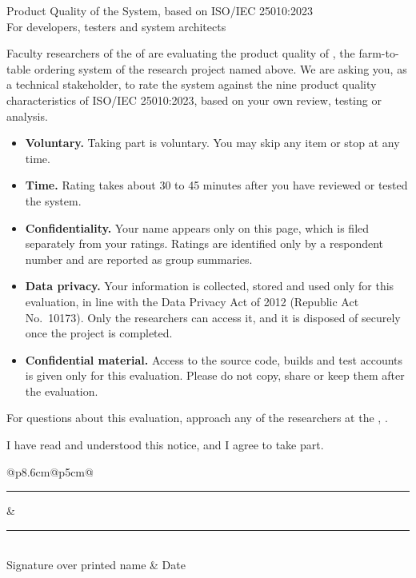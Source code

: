 \documentclass[10pt]{article}
\begin{document}
%
  {Product Quality of the \SystemName{} System, based on ISO/IEC 25010:2023\\
   For developers, testers and system architects}


Faculty researchers of the \Department{} of \University{} are evaluating the
product quality of \SystemName, the farm-to-table ordering system of the research
project named above. We are asking you, as a technical stakeholder, to rate the
system against the nine product quality characteristics of ISO/IEC 25010:2023,
based on your own review, testing or analysis.

\begin{itemize}
  \item \textbf{Voluntary.} Taking part is voluntary. You may skip any item or stop at
    any time.
  \item \textbf{Time.} Rating takes about 30 to 45 minutes after you have reviewed or
    tested the system.
  \item \textbf{Confidentiality.} Your name appears only on this page, which is filed
    separately from your ratings. Ratings are identified only by a respondent number
    and are reported as group summaries.
  \item \textbf{Data privacy.} Your information is collected, stored and used only for
    this evaluation, in line with the Data Privacy Act of 2012 (Republic Act
    No.~10173). Only the researchers can access it, and it is disposed of securely
    once the project is completed.
  \item \textbf{Confidential material.} Access to the source code, builds and test
    accounts is given only for this evaluation. Please do not copy, share or keep
    them after the evaluation.
\end{itemize}

For questions about this evaluation, approach any of the researchers at the
\Department, \University.

\vspace{4pt}
\opt{} I have read and understood this notice, and I agree to take part.

\vspace{0.9cm}
\noindent
\begin{tabular}{@{}p{8.6cm}@{\hspace{1cm}}p{5cm}@{}}
  \rule{\linewidth}{0.4pt} & \rule{\linewidth}{0.4pt}\\
  \small Signature over printed name & \small Date
\end{tabular}
\end{document}
